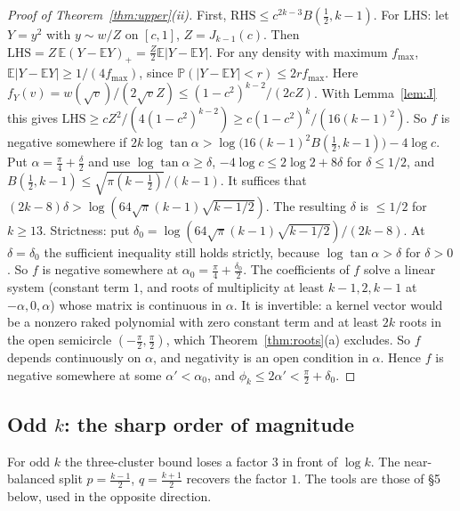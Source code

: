 \documentclass[11pt]{amsart}
\theoremstyle{definition}
\begin{document}
\begin{proof}[Proof of Theorem~\ref{thm:upper}(ii)]
First, $\mathrm{RHS}\le c^{2k-3}B(\frac12,k-1)$. For LHS: let $Y=y^2$ with $y\sim w/Z$ on $[c,1]$, $Z=J_{k-1}(c)$. Then
$\mathrm{LHS}=Z\,\mathbb E(Y-\mathbb EY)_+=\frac Z2\mathbb E|Y-\mathbb EY|$. For any density with maximum $f_{\max}$,
$\mathbb E|Y-\mathbb EY|\ge1/(4f_{\max})$, since $\mathbb P(|Y-\mathbb EY|<r)\le2rf_{\max}$. Here
$f_Y(v)=w(\sqrt v)/(2\sqrt vZ)\le(1-c^2)^{k-2}/(2cZ)$. With Lemma~\ref{lem:J} this gives
$\mathrm{LHS}\ge cZ^2/(4(1-c^2)^{k-2})\ge c(1-c^2)^k/(16(k-1)^2)$. So $f$ is negative somewhere if
$2k\log\tan\alpha>\log\big(16(k-1)^2B(\frac12,k-1)\big)-4\log c$. Put $\alpha=\frac\pi4+\frac\delta2$ and use $\log\tan\alpha\ge\delta$,
$-4\log c\le2\log2+8\delta$ for $\delta\le1/2$, and $B(\frac12,k-1)\le\sqrt{\pi(k-\frac12)}/(k-1)$. It suffices that
$(2k-8)\delta>\log(64\sqrt\pi(k-1)\sqrt{k-1/2})$. The resulting $\delta$ is $\le1/2$ for $k\ge13$.
Strictness: put $\delta_0=\log(64\sqrt\pi(k-1)\sqrt{k-1/2})/(2k-8)$. At $\delta=\delta_0$ the sufficient inequality still holds strictly,
because $\log\tan\alpha>\delta$ for $\delta>0$. So $f$ is negative somewhere at $\alpha_0=\frac\pi4+\frac{\delta_0}2$. The coefficients of $f$ solve a
linear system (constant term $1$, and roots of multiplicity at least $k-1,2,k-1$ at $-\alpha,0,\alpha$) whose matrix is continuous in $\alpha$. It is
invertible: a kernel vector would be a nonzero raked polynomial with zero constant term and at least $2k$ roots in the open semicircle
$(-\frac\pi2,\frac\pi2)$, which Theorem~\ref{thm:roots}(a) excludes. So $f$
depends continuously on $\alpha$, and negativity is an open condition in $\alpha$. Hence $f$ is negative somewhere at some $\alpha'<\alpha_0$,
and $\phi_k\le2\alpha'<\frac\pi2+\delta_0$.
\end{proof}

\subsection*{Odd $k$: the sharp order of magnitude}
For odd $k$ the three-cluster bound loses a factor $3$ in front of $\log k$. The near-balanced split $p=\frac{k-1}2$, $q=\frac{k+1}2$
recovers the factor $1$. The tools are those of \S5 below, used in the opposite direction.
\end{document}
